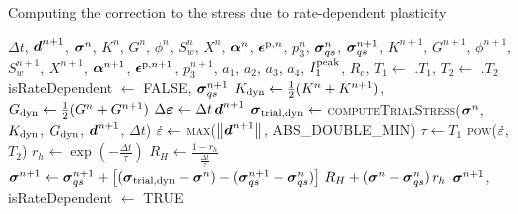 \begin{breakablealgorithm}
  \caption{Computing the correction to the stress due to rate-dependent plasticity}
  \begin{algorithmic}[1]
    \Require $\Delta t$, $\boldsymbol{d}^{n+1}$, 
             $\boldsymbol{\sigma}^n$, $K^n$, $G^n$, $\phi^n$, $S_{w}^n$, $X^n$, $\boldsymbol{\alpha}^n$, $\boldsymbol{\epsilon}^{\text{p},n}$, $p_3^n$,
             $\boldsymbol{\sigma}_{qs}^n$, $\boldsymbol{\sigma}_{qs}^{n+1}$, 
             $K^{n+1}$, $G^{n+1}$, $\phi^{n+1}$, $S_w^{n+1}$, $X^{n+1}$, $\boldsymbol{\alpha}^{n+1}$, 
             $\boldsymbol{\epsilon}^{\text{p},n+1}$, $p^{n+1}_{3}$, 
             $a_{1}$, $a_{2}$, $a_{3}$, $a_{4}$, $I_1^{\text{peak}}$, $R_c$, 
      \State $T_1 \leftarrow$ .$T_1$,
             $T_2 \leftarrow$ .$T_2$
        \State \Return isRateDependent $\leftarrow$ FALSE, $\boldsymbol{\sigma}_{qs}^{n+1}$
      \EndIf
      \State $K_{\text{dyn}} \leftarrow \tfrac{1}{2}(K^n + K^{n+1})$, $G_{\text{dyn}} \leftarrow \tfrac{1}{2}(G^n + G^{n+1})$
      \State $\Delta\boldsymbol{\varepsilon} \leftarrow \Delta t \,\boldsymbol{d}^{n+1}$ 
      \State $\boldsymbol{\sigma}_{\text{trial},\text{dyn}} \leftarrow$ \textsc{computeTrialStress}($\boldsymbol{\sigma}^n$, $K_{\text{dyn}}$, $G_{\text{dyn}}$,
                                                                        $\boldsymbol{d}^{n+1}$, $\Delta t$)
      \State $\dot{\varepsilon} \leftarrow$ \textsc{max}($\left\lVert\boldsymbol{d}^{n+1}\right\rVert_{}$, ABS\_DOUBLE\_MIN)
      \State $\tau \leftarrow T_1$ \textsc{pow}($\dot{\varepsilon}$, $T_2$)
      \State $r_h \leftarrow \exp\left(-\frac{\Delta t}{\tau}\right)$
      \State $R_H \leftarrow \frac{1 - r_h}{\frac{\Delta t}{\tau}}$
      \State $\boldsymbol{\sigma}^{n+1} \leftarrow \boldsymbol{\sigma}_{qs}^{n+1} + \left[(\boldsymbol{\sigma}_{\text{trial},\text{dyn}} - \boldsymbol{\sigma}^n) -
               (\boldsymbol{\sigma}_{qs}^{n+1} - \boldsymbol{\sigma}_{qs}^n)\right]\,R_H + (\boldsymbol{\sigma}^n - \boldsymbol{\sigma}_{qs}^n)\,r_h$
      \State \Return $\boldsymbol{\sigma}^{n+1}$, isRateDependent $\leftarrow$ TRUE
    \EndProcedure
  \end{algorithmic}
\end{breakablealgorithm}


